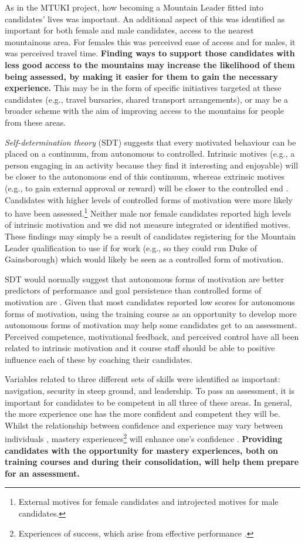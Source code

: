 \documentclass[
  12pt,
  a4paper,
]{book}
\begin{document}
As in the MTUKI project, how becoming a Mountain Leader fitted into candidates' lives was important. An additional aspect of this was identified as important for both female and male candidates, access to the nearest mountainous area. For females this was perceived ease of access and for males, it was perceived travel time. \textbf{Finding ways to support those candidates with less good access to the mountains may increase the likelihood of them being assessed, by making it easier for them to gain the necessary experience.} This may be in the form of specific initiatives targeted at these candidates (e.g., travel bursaries, shared transport arrangements), or may be a broader scheme with the aim of improving access to the mountains for people from these areas.

\emph{Self-determination theory} (SDT) suggests that every motivated behaviour can be placed on a continuum, from autonomous to controlled. Intrinsic motives (e.g., a person engaging in an activity because they find it interesting and enjoyable) will be closer to the autonomous end of this continuum, whereas extrinsic motives (e.g., to gain external approval or reward) will be closer to the controlled end \citep{Deci1985b, Deci2000}. Candidates with higher levels of controlled forms of motivation were more likely to have been assessed.\footnote{External motives for female candidates and introjected motives for male candidates.} Neither male nor female candidates reported high levels of intrinsic motivation and we did not measure integrated or identified motives. These findings may simply be a result of candidates registering for the Mountain Leader qualification to use if for work (e.g., so they could run Duke of Gainsborough) which would likely be seen as a controlled form of motivation.

SDT would normally suggest that autonomous forms of motivation are better predictors of performance and goal persistence than controlled forms of motivation are \citep{Hagger2015}. Given that most candidates reported low scores for autonomous forms of motivation, using the training course as an opportunity to develop more autonomous forms of motivation may help some candidates get to an assessment. Perceived competence, motivational feedback, and perceived control have all been related to intrinsic motivation \citep{Vallerand2001} and it course staff should be able to positive influence each of these by coaching their candidates.

Variables related to three different sets of skills were identified as important: navigation, security in steep ground, and leadership. To pass an assessment, it is important for candidates to be competent in all three of these areas. In general, the more experience one has the more confident and competent they will be. Whilst the relationship between confidence and experience may vary between individuals \citep{Weinberg2014, Hardy2019b}, mastery experiences\footnote{Experiences of success, which arise from effective performance \citep{Bandura1977}.} will enhance one's confidence \citep{Bandura1977}. \textbf{Providing candidates with the opportunity for mastery experiences, both on training courses and during their consolidation, will help them prepare for an assessment.}
\end{document}
